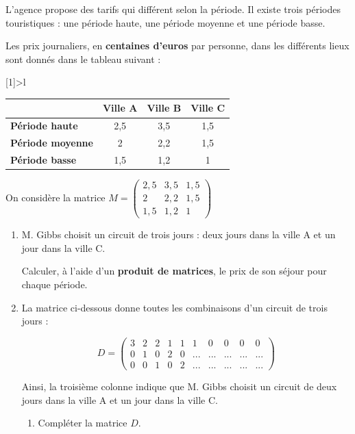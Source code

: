 \documentclass[12pt,french]{article}
\begin{document}
\begin{spacing}{1.2}
L'agence propose des tarifs qui différent selon la période. Il existe trois périodes touristiques : une période haute, une période moyenne et une période basse.

Les prix journaliers, en \textbf{centaines d'euros} par personne, dans les différents lieux sont donnés dans le tableau suivant :

\begin{center}
\newcolumntype{K}[1]{>{}l}
\begin{tabular}{|K{gray}|*{3}{c|}}
 &  \bf Ville A & \bf Ville B & \bf Ville C\\
\hline
\bf Période haute & 2,5 & 3,5 & 1,5\\
\hline
\bf Période moyenne & 2 & 2,2 & 1,5\\
\hline
\bf Période basse & 1,5 & 1,2 & 1\\
\hline
\end{tabular}
\end{center}

On considère la matrice $M=\begin{pmatrix}
2,5&3,5&1,5\\2&2,2&1,5\\1,5&1,2&1
\end{pmatrix}$

\begin{enumerate}
\item M. Gibbs choisit un circuit de trois jours : deux jours dans la ville A et un jour dans la ville C.

Calculer, à l'aide d'un \textbf{produit de matrices}, le prix de son séjour pour chaque période.

\item La matrice ci-dessous donne toutes les combinaisons d'un circuit de trois jours :

\[D=\begin{pmatrix}
3&2&2&1&1&1&0&0&0&0\\
0&1&0&2&0&...&...&...&...&...\\
0&0&1&0&2&...&...&...&...&...
\end{pmatrix}\]

Ainsi, la troisième colonne indique que M. Gibbs choisit un circuit de deux jours dans la ville A et un jour dans la ville C.

	\begin{enumerate}
	\item Compléter la matrice $D$.
	

\end{enumerate}
\end{enumerate}
\end{spacing}
\end{document}
